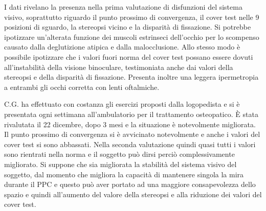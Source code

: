 I dati rivelano la presenza nella prima valutazione di disfunzioni del sistema visivo, soprattutto riguardo il punto prossimo di convergenza, il cover test nelle 9 posizioni di sguardo, la stereopsi vicino e la disparità di fissazione. Si potrebbe ipotizzare un'alterata funzione dei muscoli estrinseci dell’occhio per lo scompenso causato dalla deglutizione atipica e dalla malocclusione. Allo stesso modo è possibile ipotizzare che i valori fuori norma del cover test possano essere dovuti all’instabilità della visione binoculare, testimoniata anche dai valori della stereopsi e della disparità di fissazione. Presenta inoltre una leggera ipermetropia a entrambi gli occhi corretta con lenti oftalmiche. 

C.G. ha effettuato con costanza gli esercizi proposti dalla logopedista e si è presentata ogni settimana all’ambulatorio per il trattamento osteopatico. È stata rivalutata il 22 dicembre, dopo 3 mesi e la situazione è notevolmente migliorata. Il punto prossimo di convergenza si è avvicinato notevolmente e anche i valori del cover test si sono abbassati. Nella seconda valutazione quindi quasi tutti i valori sono rientrati nella norma e il soggetto può dirsi perciò complessivamente migliorato.
Si suppone che sia migliorata la stabilità del sistema visivo del soggetto, dal momento che migliora la capacità di mantenere singola la mira durante il PPC e questo può aver portato ad una maggiore consapevolezza dello spazio e quindi all’aumento del valore della stereopsi e alla riduzione dei valori del cover test. 
